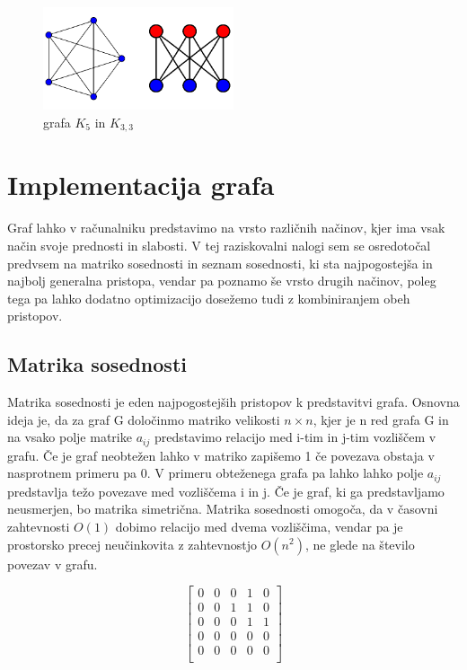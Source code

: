 \documentclass[11pt]{article}
\begin{document}
\begin{figure}[H]
    \centering
    \includegraphics[width=0.5\textwidth]{k5_k33.png}
    \caption{grafa $K_5$ in $K_{3, 3}$}
    \label{fig:mesh1}
\end{figure}

\section{Implementacija grafa}

Graf lahko v računalniku predstavimo na vrsto različnih načinov, kjer ima vsak način svoje prednosti in slabosti. V tej raziskovalni nalogi sem se osredotočal predvsem na matriko sosednosti in seznam sosednosti, ki sta najpogostejša in najbolj generalna pristopa, vendar pa poznamo še vrsto drugih načinov, poleg tega pa lahko dodatno optimizacijo dosežemo tudi z kombiniranjem obeh pristopov.

\subsection{Matrika sosednosti}

Matrika sosednosti je eden najpogostejših pristopov k predstavitvi grafa. Osnovna ideja je, da za graf G določinmo matriko velikosti $n \times n$, kjer je n red grafa G in na vsako polje matrike $a_{ij}$ predstavimo relacijo med i-tim in j-tim vozliščem v grafu. Če je graf neobtežen lahko v matriko zapišemo 1 če povezava obstaja v nasprotnem primeru pa 0. V primeru obteženega grafa pa lahko lahko polje $a_{ij}$ predstavlja težo povezave med vozliščema i in j. Če je graf, ki ga predstavljamo neusmerjen, bo matrika simetrična. Matrika sosednosti omogoča, da v časovni zahtevnosti $O(1)$ dobimo relacijo med dvema vozliščima, vendar pa je prostorsko precej neučinkovita z zahtevnostjo $O(n^{2})$, ne glede na število povezav v grafu.

\[
	\begin{bmatrix}
		0 & 0 & 0 & 1 & 0 \\
		0 & 0 & 1 & 1 & 0 \\
		0 & 0 & 0 & 1 & 1 \\
		0 & 0 & 0 & 0 & 0 \\
		0 & 0 & 0 & 0 & 0 \\
	\end{bmatrix}
\]
\end{document}
